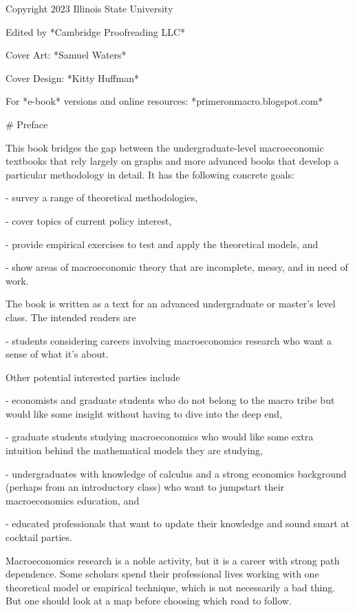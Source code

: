 ﻿\documentclass[oneside]{book}
\begin{document}
Copyright 2023 Illinois State University


Edited by *Cambridge Proofreading LLC*


Cover Art:  *Samuel Waters*


Cover Design:  *Kitty Huffman*


For *e-book* versions and online resources: *primeronmacro.blogspot.com*




# Preface


This book bridges the gap between the undergraduate-level
macroeconomic textbooks that rely largely on graphs and more advanced books
that develop a particular methodology in detail.  It has the
following concrete goals:


- survey a range of theoretical methodologies,

- cover topics of current policy interest,

- provide empirical exercises to test and apply
the theoretical models, and

- show areas of macroeconomic theory that are incomplete, messy, and in need of work.

The book is written as a text for an advanced undergraduate or master's level class. The intended readers are


- students considering careers involving macroeconomics research who
want a sense of what it's about.

Other potential interested parties include



- economists and graduate students who do not belong to the macro
tribe but would like some insight without having to dive into the deep end,

- graduate students studying macroeconomics who would like some extra intuition behind the mathematical models they are studying,

- undergraduates with knowledge of calculus and a strong economics
background (perhaps from an introductory class) who want to jumpstart their
macroeconomics education,
and

- educated professionals that want to update their knowledge and sound smart at cocktail parties.

Macroeconomics research is a noble activity, but it is a career with strong
path dependence. Some scholars spend their professional lives working with
one theoretical model or empirical technique, which is not necessarily a bad
thing. But one should look at a map before choosing which road to follow.
\end{document}
